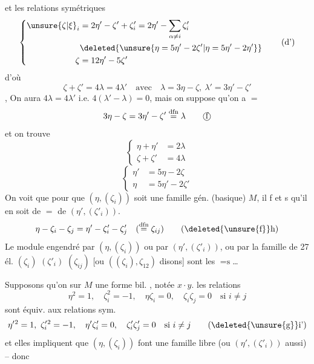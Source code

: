 et les relations symétriques
\[
\left\{\begin{aligned}
\unsure{\zeta|\xi}_i&=2\eta'-\zeta'+\zeta'_i=2\eta'-\sum_{\alpha\ne i}\zeta'_i\\
&\deleted{\unsure{\eta=5\eta'-2\zeta'|\eta=5\eta'-2\eta'}}\\
\zeta&=12\eta'-5\zeta'
\end{aligned}\right.\tag*{(d')}
\]
d'où
\[
\zeta+\zeta'=4\lambda=4\lambda'\quad\text{avec}\quad
\lambda=3\eta-\zeta,\ \lambda'=3\eta'-\zeta'\tag*{(e)}
\]
, On aura  $4\lambda=4\lambda'$ i.e. $4(\lambda'-\lambda)=0$, mais on suppose qu'on a $=$
\[
3\eta-\zeta=3\eta'-\zeta'\overset{\mathrm{dfn}}=\lambda\tag*{\textcircled{f}}
\]
et on trouve 
\[
\left\{\begin{aligned}\eta+\eta'&=2\lambda\\\zeta+\zeta'&=4\lambda\end{aligned}\right.\tag*{(f)}
\]
\[
\left\{\begin{aligned}\eta'&=5\eta-2\zeta\\\eta&=5\eta'-2\zeta'\end{aligned}\right.\tag*{(g,g')}
\]
On voit que pour que $(\eta,(\zeta_i))$ soit une famille gén. (basique)  $M$, il f et s qu'il en soit de $=$ de $(\eta',(\zeta'_i))$.  
\[
\eta-\zeta_i-\zeta_j=\eta'-\zeta'_i-\zeta'_j\quad(\overset{\mathrm{dfn}}=\zeta_{ij})\tag*{(\deleted{\unsure{f}}h)}
\]
Le module engendré par  $(\eta,(\zeta_i))$ ou par $(\eta',(\zeta'_i))$, ou par la  famille de 27 él. $(\zeta_i)$ $(\zeta'_i)$ $(\zeta_{ij})$ [ou  $((\zeta_i),\zeta_{12})$ disons] sont les $=\text{s}$\ldots

Supposons qu'on   sur $M$ une forme bil. , notée $x\cdot y$.   les relations
\[
\eta^2=1,\quad\zeta_i^2=-1,\quad\eta\zeta_i=0,\quad\zeta_i\zeta_j=0\quad\text{si }i\ne j\tag*{(i)}
\]
sont équiv. aux relations sym.
\[
\eta'{}^2=1,\ \zeta'_i{}^2=-1,\quad\eta'\zeta'_i=0,\quad\zeta'_i\zeta'_j=0\quad\text{si }i\ne j\tag*{(\deleted{\unsure{g}}i')}
\]
et elles impliquent que $(\eta,(\zeta_i))$ font une famille libre (ou $(\eta',(\zeta'_i))$ aussi) -- donc

